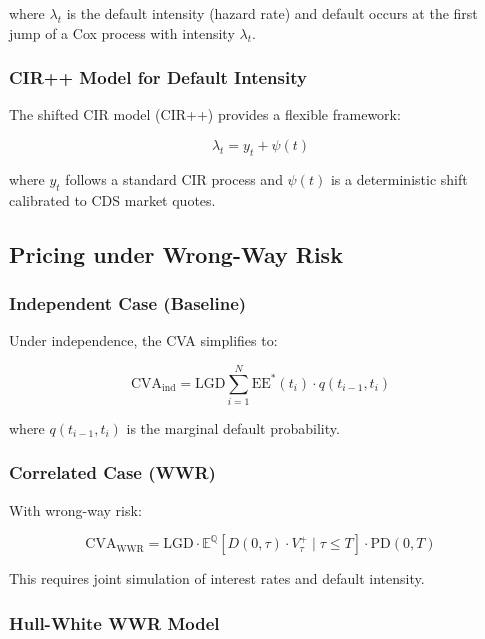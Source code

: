 \documentclass[conference]{IEEEtran}
\theoremstyle{definition}
\newcommand{\E}{\mathbb{E}}
\newcommand{\Q}{\mathbb{Q}}
\newcommand{\LGD}{\mathrm{LGD}}
\newcommand{\PD}{\mathrm{PD}}
\newcommand{\EE}{\mathrm{EE}}
\newcommand{\CVA}{\mathrm{CVA}}
\begin{document}
where $\lambda_t$ is the default intensity (hazard rate) and default occurs at the first jump of a Cox process with intensity $\lambda_t$.

\subsubsection{CIR++ Model for Default Intensity}

The shifted CIR model (CIR++) provides a flexible framework:

\begin{equation}
\lambda_t = y_t + \psi(t)
\end{equation}

where $y_t$ follows a standard CIR process and $\psi(t)$ is a deterministic shift calibrated to CDS market quotes.

\subsection{Pricing under Wrong-Way Risk}

\subsubsection{Independent Case (Baseline)}

Under independence, the CVA simplifies to:

\begin{equation}
\CVA_{\text{ind}} = \LGD \sum_{i=1}^{N} \EE^*(t_i) \cdot q(t_{i-1}, t_i)
\end{equation}

where $q(t_{i-1}, t_i)$ is the marginal default probability.

\subsubsection{Correlated Case (WWR)}

With wrong-way risk:

\begin{equation}
\CVA_{\text{WWR}} = \LGD \cdot \E^{\Q}\left[ D(0,\tau) \cdot V_\tau^+ \mid \tau \leq T \right] \cdot \PD(0,T)
\end{equation}

This requires joint simulation of interest rates and default intensity.

\subsubsection{Hull-White WWR Model}
\end{document}
